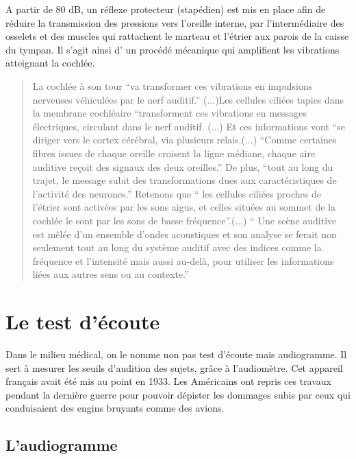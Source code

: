 A partir de 80 dB, un réflexe protecteur (stapédien) est mis en place
afin de réduire la transmission des pressions vers l\textquoteright oreille
interne, par l\textquoteright intermédiaire des osselets et des muscles
qui rattachent le marteau et l\textquoteright étrier aux parois de
la caisse du tympan. Il s'agit ainsi d' un procédé mécanique qui amplifient
les vibrations atteignant la cochlée. 
\begin{quotation}
	La cochlée à son tour ``va transformer ces vibrations en impulsions
	nerveuses véhiculées par le nerf auditif.'' (...)Les cellules ciliées
	tapies dans la membrane cochléaire ``transforment ces vibrations
	en messages électriques, circulant dans le nerf auditif. (...) Et
	ces informations vont ``se diriger vers le cortex cérébral, via plusieurs
	relais.(...) ``Comme certaines fibres issues de chaque oreille croisent
	la ligne médiane, chaque aire auditive reçoit des signaux des deux
	oreilles.'' De plus, ``tout au long du trajet, le message subit
	des transformations dues aux caractéristiques de l'activité des neurones.''
	Retenons que `` les cellules ciliées proches de l'étrier sont activées
	par les sons aigus, et celles situées au sommet de la cochlée le sont
	par les sons de basse fréquence''.(...) `` Une scène auditive est
	mêlée d'un ensemble d'ondes acoustiques et son analyse se ferait non
	seulement tout au long du système auditif avec des indices comme la
	fréquence et l'intensité mais aussi au-delà, pour utiliser les informations
	liées aux autres sens ou au contexte.'' \autocite[chap.1, pp.~15--16]{bigand:cerveau}
\end{quotation}



\chapter{Le test d'écoute}

Dans le milieu médical, on le nomme non pas test d'écoute mais audiogramme. Il
sert à mesurer les seuils d'audition des sujets, grâce à l'audiomètre. Cet 
appareil français avait été mis au point en 1933. Les Américains
ont repris ces travaux pendant la dernière guerre pour pouvoir dépister
les dommages subis par ceux qui conduisaient des engins bruyants comme
des avions.

\section{L'audiogramme}

